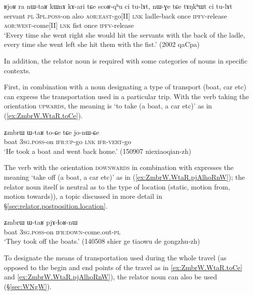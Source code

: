\begin{exe}
\ex \label{ex:scoRqhu.tulAt}
\gll ʁjoʁ ra nɯ-taʁ kɯnɤ kɤ-ari tɕe scoʁ-qʰu ci tu-lɤt, nɯ-ɣe tɕe tɤŋkʰɯt ci tu-lɤt \\
servant \textsc{pl} \textsc{3pl}.\textsc{poss}-on also \textsc{aor}:\textsc{east}-go[II] \textsc{lnk} ladle-back once \textsc{ipfv}-release \textsc{aor}:\textsc{west}-come[II] \textsc{lnk} fist once \textsc{ipfv}-release \\
\glt `Every time she went right she would hit the servants with the back of the ladle, every time she went left she hit them with the fist.' (2002 qaCpa)
\end{exe} 

In addition, the relator noun  is required with some categories of nouns in specific contexts.

First,  in combination with a noun designating a type of transport (boat, car etc) can express the transportation used in a particular trip. With the verb  taking the orientation \textsc{upwards}, the meaning is `to take (a boat, a car etc)' as in (\ref{ex:ZmbrW.WtaR.toCe}). 

\begin{exe}
\ex \label{ex:ZmbrW.WtaR.toCe}
\gll ʑmbrɯ ɯ-taʁ to-ɕe tɕe jo-nɯ-ɕe \\
boat \textsc{3sg}.\textsc{poss}-on \textsc{ifr}:\textsc{up}-go \textsc{lnk} \textsc{ifr}-\textsc{vert}-go \\
\glt `He took a boat and went back home.' (150907 niexiaoqian-zh) 
\end{exe} 

The verb  with the orientation \textsc{downwards} in combination with  expresses the meaning `take off (a boat, a car etc)' as in (\ref{ex:ZmbrW.WtaR.pjAlhoRnW}); the relator noun itself is neutral as to the type of location (static, motion from, motion towards)), a topic discussed in more detail in §\ref{sec:relator.postposition.location}.

\begin{exe}
\ex \label{ex:ZmbrW.WtaR.pjAlhoRnW}
\gll ʑmbrɯ ɯ-taʁ pjɤ-ɬoʁ-nɯ  \\
boat \textsc{3sg}.\textsc{poss}-on \textsc{ifr}:\textsc{down}-come.out-\textsc{pl} \\
\glt `They took off the boats.' (140508 shier ge tiaowu de gongzhu-zh) 
\end{exe} 

To designate the means of transportation used during the whole  travel (as opposed to the begin and end points of the travel as in \ref{ex:ZmbrW.WtaR.toCe} and \ref{ex:ZmbrW.WtaR.pjAlhoRnW}), the relator noun  can also be used (§\ref{sec:WNgW}).

